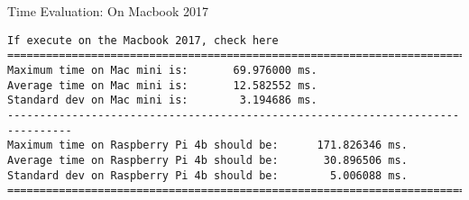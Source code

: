 \begin{frame}[fragile]{Time Evaluation: On Macbook 2017}
\tiny
{
\begin{verbatim}If execute on the Macbook 2017, check here
================================================================================
Maximum time on Mac mini is:       69.976000 ms.
Average time on Mac mini is:       12.582552 ms.
Standard dev on Mac mini is:        3.194686 ms.
--------------------------------------------------------------------------------
Maximum time on Raspberry Pi 4b should be:      171.826346 ms.
Average time on Raspberry Pi 4b should be:       30.896506 ms.
Standard dev on Raspberry Pi 4b should be:        5.006088 ms.
================================================================================
\end{verbatim}
}
\end{frame}
